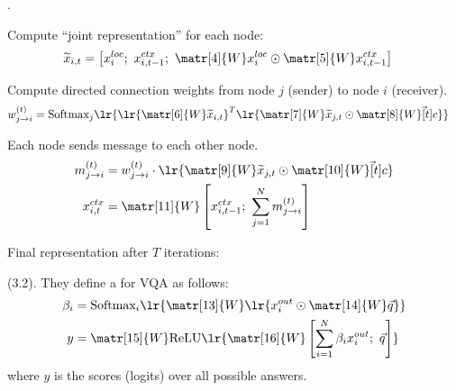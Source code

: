 \documentclass[11pt]{article}
\begin{document}
. 
\begin{compactenum}
	\item Compute ``joint representation'' for each node:
	\begin{align}
		\widetilde{x}_{i,t}
			&= \left[     x_i^{loc}; ~ x_{i,t-1}^{ctx}; ~ \matr[4]{W} x_i^{loc} \odot \matr[5]{W} x_{i,t-1}^{ctx} \right]
	\end{align}
	
	\item Compute directed connection weights from node $j$ (sender) to node $i$ (receiver). 
	\begin{align}
			w_{j\rightarrow i}^{(t)}
				&= \text{Softmax}_j \lr{  
						\lr{ \matr[6]{W} \widetilde{x}_{i,t}   }^T \lr{   \matr[7]{W}\widetilde{x}_{j,t} \odot   \matr[8]{W} \vec[t]{c}  }
				}
	\end{align}
	
	\item Each node sends message to each other node. 
	\begin{align}
		m_{j \rightarrow i}^{(t)}
			&= w_{j\rightarrow i}^{(t)} \cdot \lr{  \matr[9]{W}\widetilde{x}_{j,t} \odot   \matr[10]{W} \vec[t]{c}    } \\
		x_{i,t}^{ctx}
			&= \matr[11]{W} \left[     x_{i,t-1}^{ctx}; ~ \sum_{j=1}^{N}   m_{j \rightarrow i}^{(t)}   \right]
	\end{align}

	\item Final representation after $T$ iterations:
\end{compactenum}


 (3.2). They define a  for VQA as follows:
\begin{align}
	\beta_i 
		&= \text{Softmax}_i\lr{ \matr[13]{W} \lr{ x_i^{out} \odot \matr[14]{W} \vec q }   } \\
	y 
		&=  \matr[15]{W} \text{ReLU} \lr{ \matr[16]{W} \left[      \sum_{i=1}^{N} \beta_i x_i^{out}  ; ~ \vec q \right] }
\end{align}
where $y$ is the scores (logits) over all possible answers.






\end{document}
